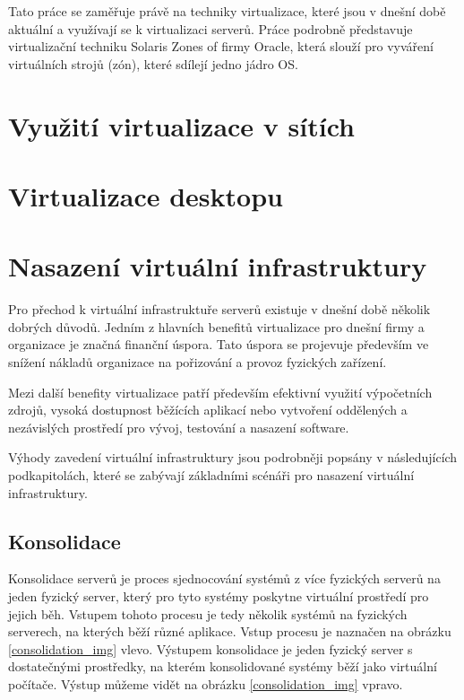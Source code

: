 Tato práce se zaměřuje právě na techniky virtualizace, které jsou v dnešní době aktuální a využívají se k virtualizaci serverů. Práce podrobně představuje virtualizační techniku Solaris Zones of firmy Oracle, která slouží pro
vyváření virtuálních strojů (zón), které sdílejí jedno jádro OS.

\section{Využití virtualizace v sítích}



\section{Virtualizace desktopu}



\section{Nasazení virtuální infrastruktury}

Pro přechod k virtuální infrastruktuře serverů existuje v dnešní době několik dobrých důvodů. Jedním z hlavních benefitů virtualizace pro dnešní firmy a organizace je značná finanční úspora. Tato úspora se
projevuje především ve snížení nákladů organizace na pořizování a provoz fyzických zařízení. 

Mezi další benefity virtualizace patří především efektivní využití výpočetních zdrojů, vysoká dostupnost běžících aplikací nebo vytvoření oddělených a nezávislých prostředí pro vývoj, testování a nasazení software.

Výhody zavedení virtuální infrastruktury jsou podrobněji popsány v následujících podkapitolách, které se zabývají základními scénáři pro nasazení virtuální infrastruktury.

\subsection{Konsolidace}
\label{consolidation}

Konsolidace serverů je proces sjednocování systémů z více fyzických serverů na jeden fyzický server, který pro tyto systémy poskytne virtuální prostředí pro jejich běh. Vstupem tohoto procesu je tedy několik systémů na fyzických serverech,
na kterých běží různé aplikace. Vstup procesu je naznačen na obrázku \ref{consolidation_img} vlevo. Výstupem konsolidace je jeden fyzický server s dostatečnými prostředky, na kterém konsolidované systémy běží jako virtuální počítače.
Výstup můžeme vidět na obrázku \ref{consolidation_img} vpravo.

